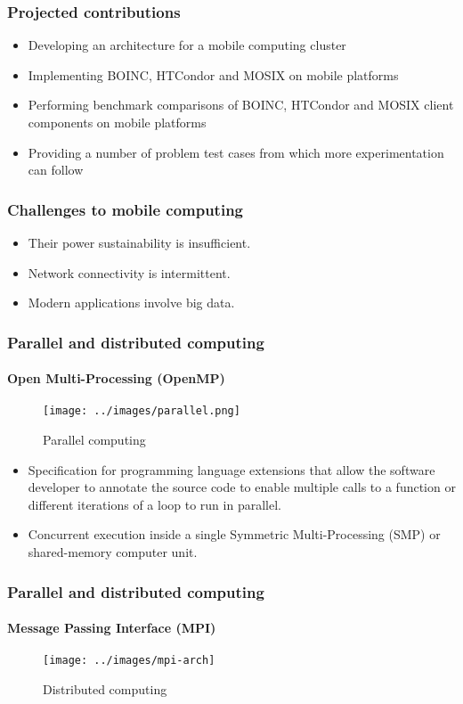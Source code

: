 \documentclass[11pt]{beamer}
\begin{document}
\begin{frame}
\frametitle{Projected contributions}
\begin{itemize}
	\item Developing an architecture for a mobile computing cluster
	\item Implementing BOINC, HTCondor and MOSIX on mobile platforms
	\item Performing benchmark comparisons of BOINC, HTCondor and MOSIX client components on mobile platforms
	\item Providing a number of problem test cases from which more experimentation can follow
\end{itemize}
\end{frame}

\begin{frame}
\frametitle{Challenges to mobile computing}
\begin{itemize}
	\item Their power sustainability is insufficient.
	\item Network connectivity is intermittent.
	\item Modern applications involve big data.
\end{itemize}
\end{frame}

\begin{frame}
\frametitle{Parallel and distributed computing}
\framesubtitle{Open Multi-Processing (OpenMP)}
\begin{figure}[h]
	\centering
	\texttt{[image: ../images/parallel.png]}
	\caption{Parallel computing}
	\label{parallel_openmp}
\end{figure}
\begin{itemize}
	\item Specification for programming language extensions that allow the software developer to annotate the source code to enable multiple calls to a function or different iterations of a loop to run in parallel.
	\item Concurrent execution inside a single Symmetric Multi-Processing (SMP) or shared-memory computer unit.
\end{itemize}
\end{frame}

\begin{frame}
\frametitle{Parallel and distributed computing}
\framesubtitle{Message Passing Interface (MPI)}
\begin{figure}[h]
	\centering
	\texttt{[image: ../images/mpi-arch]}
	\caption{Distributed computing}
	\label{distributed_mpi}
\end{figure}
\end{frame}
\end{document}
